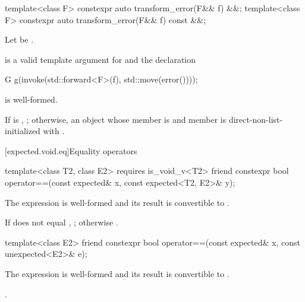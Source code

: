 %
\begin{itemdecl}
template<class F> constexpr auto transform_error(F&& f) &&;
template<class F> constexpr auto transform_error(F&& f) const &&;
\end{itemdecl}

\begin{itemdescr}
\pnum
Let  be
.

\pnum
\mandates
{} is a valid template argument
for  and the declaration
\begin{codeblock}
G g(invoke(std::forward<F>(f), std::move(error())));
\end{codeblock}
is well-formed.

\pnum
\returns
If  is , ; otherwise, an
 object whose  member is 
and  member is direct-non-list-initialized with
.
\end{itemdescr}

[expected.void.eq]{Equality operators}

%
\begin{itemdecl}
template<class T2, class E2> requires is_void_v<T2>
  friend constexpr bool operator==(const expected& x, const expected<T2, E2>& y);
\end{itemdecl}

\begin{itemdescr}
\pnum
\mandates
The expression  is well-formed and
its result is convertible to .

\pnum
\returns
If  does not equal , ;
otherwise .
\end{itemdescr}

%
\begin{itemdecl}
template<class E2>
  friend constexpr bool operator==(const expected& x, const unexpected<E2>& e);
\end{itemdecl}

\begin{itemdescr}
\pnum
\mandates
The expression  is well-formed and
its result is convertible to .

\pnum
\returns
{}.
\end{itemdescr}

